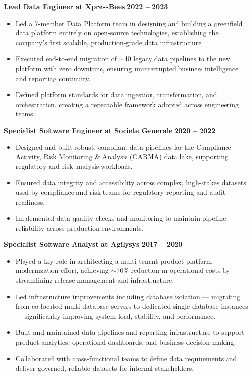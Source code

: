\documentclass[10pt,a4paper]{article}
\begin{document}
\vspace{0.5em}

\noindent
\textbf{Lead Data Engineer at XpressBees} \hfill \textbf{2022 -- 2023}
\begin{itemize}
    \item Led a 7-member Data Platform team in designing and building a greenfield data platform entirely on open-source technologies, establishing the company's first scalable, production-grade data infrastructure.
    \item Executed end-to-end migration of $\sim$40 legacy data pipelines to the new platform with zero downtime, ensuring uninterrupted business intelligence and reporting continuity.
    \item Defined platform standards for data ingestion, transformation, and orchestration, creating a repeatable framework adopted across engineering teams.
\end{itemize}

\vspace{0.5em}

\noindent
\textbf{Specialist Software Engineer at Societe Generale} \hfill \textbf{2020 -- 2022}
\begin{itemize}
    \item Designed and built robust, compliant data pipelines for the Compliance Activity, Risk Monitoring \& Analysis (CARMA) data lake, supporting regulatory and risk analysis workloads.
    \item Ensured data integrity and accessibility across complex, high-stakes datasets used by compliance and risk teams for regulatory reporting and audit readiness.
    \item Implemented data quality checks and monitoring to maintain pipeline reliability across production environments.
\end{itemize}

\vspace{0.5em}

\noindent
\textbf{Specialist Software Analyst at Agilysys} \hfill \textbf{2017 -- 2020}
\begin{itemize}
    \item Played a key role in architecting a multi-tenant product platform modernization effort, achieving $\sim$70\% reduction in operational costs by streamlining release management and infrastructure.
    \item Led infrastructure improvements including database isolation --- migrating from co-located multi-database servers to dedicated single-database instances --- significantly improving system load, stability, and performance.
    \item Built and maintained data pipelines and reporting infrastructure to support product analytics, operational dashboards, and business decision-making.
    \item Collaborated with cross-functional teams to define data requirements and deliver governed, reliable datasets for internal stakeholders.
\end{itemize}
\end{document}
